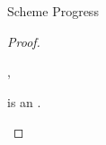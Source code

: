 \begin{theorem}{Scheme Progress}
\begin{proof}
\begin{case}{\pssm}
\renewcommand{\x}{\cslist{\second{\varcsm}}}
\renewcommand{\y}{\expnils{\first{\vartym}}}
\renewcommand{\z}{\expcons{\first{\varvalum}}{\second{\varvalum}}}

\begin{subcase}{\x}

\psvalcanin
{\first{\varexpm}}
{\y, \z}
\psred
{\expsm{\x}{(\y)}}
{\expnild}
\psred
{\expsm{\x}{(\z)}}
{\expcons{(\expsm{\second{\varcsm}}{\first{\varvalum}})}{(\expsm{\x}{\second{\varvalum}})}}

\end{subcase}


\renewcommand{\x}{\csfun{\second{\varcsm}}{\third{\varcsm}}}
\renewcommand{\y}{\expfabss{\first{\varvarm}}{\first{\vartym}}{\first{\varexpm}}}

\begin{subcase}{\x}

\psvalcaneq
{\first{\varexpm}}
{\y}
\psred
{\expsm{(\x)}{(\y)}}
{\expfabsd{\first{\varvars}}{\expsm{\third{\varcsm}}{(\expfapp{(\y)}{(\expms{\second{\varcsm}}{\first{\varvars}})})}}}

\end{subcase}


\renewcommand{\x}{\csfor{\first{\csvarm}}{\second{\varcsm}}}
\renewcommand{\y}{\exptabs{\second{\tyvarm}}{\second{\varexpm}}}

\begin{subcase}{\x}

\psvalcaneq
{\first{\varexpm}}
{\y}
\psred
{\expsm{(\x)}{(\y)}}
{\expsm{\cssubst{\second{\varcsm}}{\cslump}{\first{\csvarm}}}{\expsubst{\second{\varexpm}}{\tylump}{\second{\tyvarm}}}}

\end{subcase}


\renewcommand{\x}{\csbrand{\first{\varbrand}}{\first{\vartym}}}

\begin{subcase}{\x}

\expsm{(\x)}{\first{\varexpm}} is an \prouv.

\end{subcase}

\end{case}

\end{proof}

\end{theorem}
